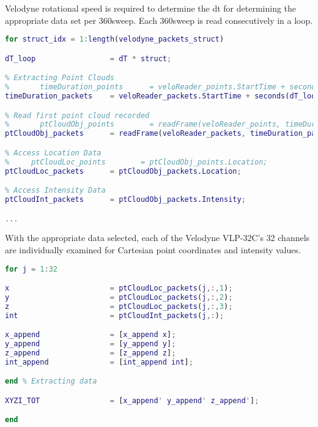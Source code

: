 \documentclass[numbered,pdftex]{ohio-etd}
\begin{document}
{Velodyne rotational speed is required to determine the dt for determining the appropriate data set per 360\degree sweep. Each 360\degree sweep is read consecutively in a loop. }

\begin{lstlisting}[language=Matlab]
for struct_idx = 1:length(velodyne_packets_struct)

dT_loop                 = dT * struct;

% Extracting Point Clouds
%       timeDuration_points      = veloReader_points.StartTime + seconds(dT);
timeDuration_packets    = veloReader_packets.StartTime + seconds(dT_loop);

% Read first point cloud recorded
%       ptCloudObj_points        = readFrame(veloReader_points, timeDuration_packets);
ptCloudObj_packets      = readFrame(veloReader_packets, timeDuration_packets);

% Access Location Data
%     ptCloudLoc_points        = ptCloudObj_points.Location;
ptCloudLoc_packets      = ptCloudObj_packets.Location;

% Access Intensity Data
ptCloudInt_packets      = ptCloudObj_packets.Intensity;

...\end{lstlisting}				

{With the appropriate data selected, each of the Velodyne VLP-32C's 32 channels are individually examined for Cartesian point coordinates and intensity values.}

\begin{lstlisting}[language=Matlab]
% Extracting data
for j = 1:32

x                       = ptCloudLoc_packets(j,:,1);
y                       = ptCloudLoc_packets(j,:,2);
z                       = ptCloudLoc_packets(j,:,3);
int                     = ptCloudInt_packets(j,:);

x_append                = [x_append x];
y_append                = [y_append y];
z_append                = [z_append z];
int_append              = [int_append int];

end % Extracting data

XYZI_TOT                = [x_append' y_append' z_append'];

end\end{lstlisting}	

	
	
\end{document}
